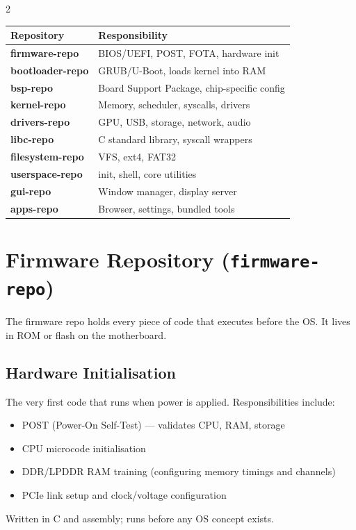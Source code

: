 2\documentclass[11pt,a4paper]{article}
\begin{document}
\begin{center}
\begin{tabular}{>{\bfseries}p{4cm} p{9cm}}
\toprule
\rowcolor{tablehead} Repository & Responsibility \\
\midrule
firmware-repo   & BIOS/UEFI, POST, FOTA, hardware init \\
bootloader-repo & GRUB/U-Boot, loads kernel into RAM \\
bsp-repo        & Board Support Package, chip-specific config \\
kernel-repo     & Memory, scheduler, syscalls, drivers \\
drivers-repo    & GPU, USB, storage, network, audio \\
libc-repo       & C standard library, syscall wrappers \\
filesystem-repo & VFS, ext4, FAT32 \\
userspace-repo  & init, shell, core utilities \\
gui-repo        & Window manager, display server \\
apps-repo       & Browser, settings, bundled tools \\
\bottomrule
\end{tabular}
\end{center}

\section{Firmware Repository (\texttt{firmware-repo})}

The firmware repo holds every piece of code that executes before the OS. It lives in ROM or flash on the motherboard.

\subsection{Hardware Initialisation}
The very first code that runs when power is applied. Responsibilities include:
\begin{itemize}[noitemsep]
  \item POST (Power-On Self-Test) --- validates CPU, RAM, storage
  \item CPU microcode initialisation
  \item DDR/LPDDR RAM training (configuring memory timings and channels)
  \item PCIe link setup and clock/voltage configuration
\end{itemize}
Written in C and assembly; runs before any OS concept exists.
\end{document}

